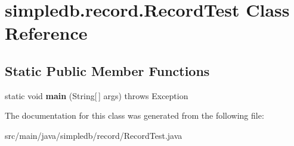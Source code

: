 \hypertarget{classsimpledb_1_1record_1_1RecordTest}{}\section{simpledb.\+record.\+Record\+Test Class Reference}
\label{classsimpledb_1_1record_1_1RecordTest}
\subsection*{Static Public Member Functions}
\begin{DoxyCompactItemize}
\item 
\mbox{\label{classsimpledb_1_1record_1_1RecordTest_a7b2182b2ee9779cb7631429909e4280b}} 
static void {\bfseries main} (String\mbox{[}$\,$\mbox{]} args)  throws Exception 
\end{DoxyCompactItemize}


The documentation for this class was generated from the following file\+:\begin{DoxyCompactItemize}
\item 
src/main/java/simpledb/record/Record\+Test.\+java\end{DoxyCompactItemize}
